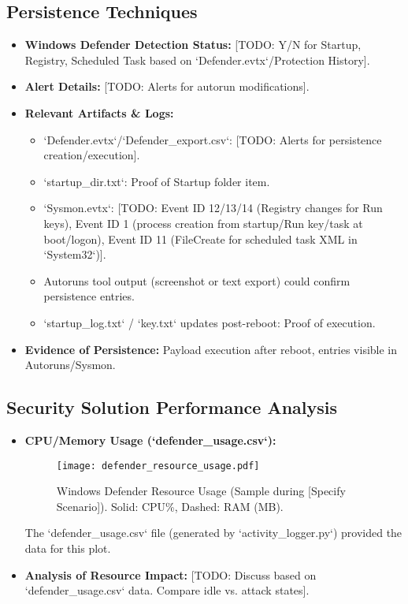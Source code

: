 \documentclass[11pt]{article}
\begin{document}
	\subsection{Persistence Techniques}
	\begin{itemize}
		\item \textbf{Windows Defender Detection Status:} [TODO: Y/N for Startup, Registry, Scheduled Task based on `Defender.evtx`/Protection History].
		\item \textbf{Alert Details:} [TODO: Alerts for autorun modifications].
		\item \textbf{Relevant Artifacts & Logs:}
		\begin{itemize}
			\item `Defender.evtx`/`Defender_export.csv`: [TODO: Alerts for persistence creation/execution].
			\item `startup_dir.txt`: Proof of Startup folder item.
			\item `Sysmon.evtx`: [TODO: Event ID 12/13/14 (Registry changes for Run keys), Event ID 1 (process creation from startup/Run key/task at boot/logon), Event ID 11 (FileCreate for scheduled task XML in `System32\Tasks`)].
			\item Autoruns tool output (screenshot or text export) could confirm persistence entries.
			\item `startup_log.txt` / `key.txt` updates post-reboot: Proof of execution.
		\end{itemize}
		\item \textbf{Evidence of Persistence:} Payload execution after reboot, entries visible in Autoruns/Sysmon.
	\end{itemize}
	
	\subsection{Security Solution Performance Analysis}
	\begin{itemize}
		\item \textbf{CPU/Memory Usage (`defender_usage.csv`):}
		\begin{figure}[H]
			\centering
			\texttt{[image: defender\_resource\_usage.pdf]}
			\caption{Windows Defender Resource Usage (Sample during [Specify Scenario]). Solid: CPU\%, Dashed: RAM (MB).}
			\label{fig:defender_usage} %
		\end{figure}
		The `defender_usage.csv` file (generated by `activity_logger.py`) provided the data for this plot.
		\item \textbf{Analysis of Resource Impact:} [TODO: Discuss based on `defender_usage.csv` data. Compare idle vs. attack states].
	\end{itemize}
	
\end{document}
